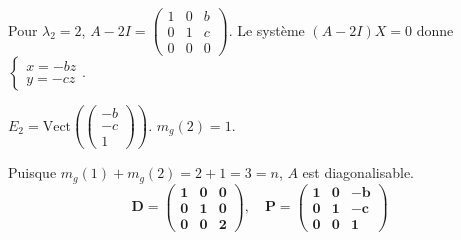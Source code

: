\documentclass[french]{yLectureNote}
\begin{document}
\begin{enumerate}
\begin{enumerate}
        Pour $\lambda_2 = 2$, $A - 2I = \begin{pmatrix} 1&0&b\\ 0&1&c\\ 0&0&0 \end{pmatrix}$. Le système $(A-2I)X=0$ donne $\begin{cases} x = -bz \\ y = -cz \end{cases}$.

        $E_2 = \text{Vect}\left(\begin{pmatrix}-b\\ -c\\ 1\end{pmatrix}\right)$. $m_g(2) = 1$.

        Puisque $m_g(1) + m_g(2) = 2+1 = 3 = n$, $A$ est diagonalisable.
        $$\mathbf{D = \begin{pmatrix} 1&0&0\\ 0&1&0\\ 0&0&2 \end{pmatrix}, \quad P = \begin{pmatrix} 1&0&-b\\ 0&1&-c\\ 0&0&1 \end{pmatrix}}$$


\end{enumerate}
\end{enumerate}
\end{document}
